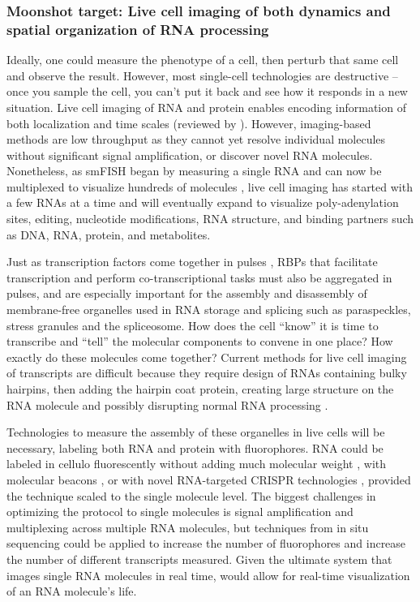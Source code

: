 \subsubsection{Moonshot target: Live cell imaging of both dynamics and spatial organization of RNA processing}

Ideally, one could measure the phenotype of a cell, then perturb that same cell and observe the result. However, most single-cell technologies are destructive -- once you sample the cell, you can't put it back and see how it responds in a new situation. Live cell imaging of RNA and protein enables encoding information of both localization and time scales (reviewed by \citet{Buxbaum2015-eu}). However, imaging-based methods are low throughput as they cannot yet resolve individual molecules without significant signal amplification, or discover novel RNA molecules. Nonetheless, as smFISH began by measuring a single RNA and can now be multiplexed to visualize hundreds of molecules \cite{Shah2016-sn}, live cell imaging has started with a few RNAs at a time and will eventually expand to visualize poly-adenylation sites, editing, nucleotide modifications, RNA structure, and binding partners such as DNA, RNA, protein, and metabolites.

Just as transcription factors come together in pulses \cite{Cai2008-zl,Cohen-Saidon2009-ib,Hao2011-sp,Lahav2004-oq,Levine2013-nb,Lin2015-ax,Locke2011-tc,Nelson2004-tk,Purvis2013-fa,Yosef2011-jy}, RBPs that facilitate transcription and perform co-transcriptional tasks must also be aggregated in pulses, and are especially important for the assembly and disassembly of membrane-free organelles used in RNA storage and splicing such as paraspeckles, stress granules and the spliceosome. How does the cell ``know'' it is time to transcribe and ``tell'' the molecular components to convene in one place? How exactly do these molecules come together? Current methods for live cell imaging of transcripts are difficult because they require design of RNAs containing bulky hairpins, then adding the hairpin coat protein, creating large structure on the RNA molecule and possibly disrupting normal RNA processing \cite{Coulon2014-he,Hocine2013-if,Tyagi2009-jq}. 

Technologies to measure the assembly of these organelles in live cells will be necessary, labeling both RNA and protein with fluorophores. RNA could be labeled in cellulo fluorescently without adding much molecular weight \cite{Custer2016-gt}, with molecular beacons \cite{Santangelo2010-ry}, or with novel RNA-targeted CRISPR technologies \cite{Nelles2016-my}, provided the technique scaled to the single molecule level. The biggest challenges in optimizing the protocol to single molecules is signal amplification and multiplexing across multiple RNA molecules, but techniques from in situ sequencing could be applied to increase the number of fluorophores and increase the number of different transcripts measured. Given the ultimate system that images single RNA molecules in real time, would allow for real-time visualization of an RNA molecule's life.


